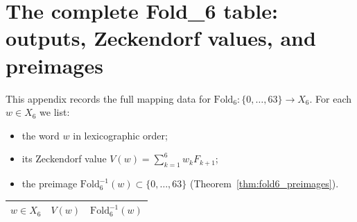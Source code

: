 
\section{The complete Fold\_6 table: outputs, Zeckendorf values, and preimages}
\label{app:fold6_table}

This appendix records the full mapping data for $\mathrm{Fold}_6:\{0,\dots,63\}\to X_6$.
For each $w\in X_6$ we list:
\begin{itemize}
\item the word $w$ in lexicographic order;
\item its Zeckendorf value $V(w)=\sum_{k=1}^6 w_k F_{k+1}$;
\item the preimage $\mathrm{Fold}_6^{-1}(w)\subset\{0,\dots,63\}$ (Theorem~\ref{thm:fold6_preimages}).
\end{itemize}

\begin{center}
\small
\setlength{\tabcolsep}{5pt}
\renewcommand{\arraystretch}{1.1}
\begin{tabular}{lll}
\toprule
$w\in X_6$ & $V(w)$ & $\mathrm{Fold}_6^{-1}(w)$ \\
\midrule

\end{tabular}
\end{center}



